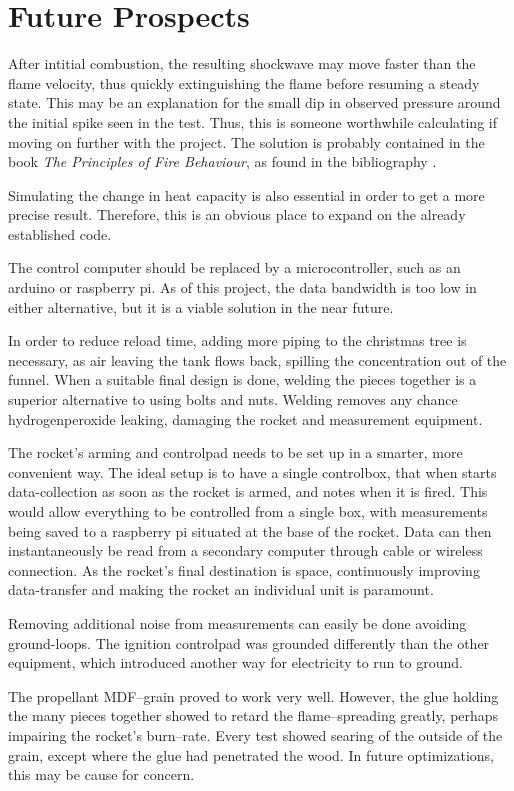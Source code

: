\chapter{Future Prospects}\label{cha:perspective}

After intitial combustion, the resulting shockwave may move faster than the flame velocity, thus quickly extinguishing the flame before resuming a steady state. This may be an explanation for the small dip in observed pressure around the initial spike seen in the test. Thus, this is someone worthwhile calculating if moving on further with the project. The solution is probably contained in the book \emph{The Principles of Fire Behaviour}, as found in the bibliography \cite{principlesoffire}.

Simulating the change in heat capacity is also essential in order to get a more precise result. Therefore, this is an obvious place to expand on the already established code.

The control computer should be replaced by a microcontroller, such as an arduino or raspberry pi. As of this project, the data bandwidth is too low in either alternative, but it is a viable solution in the near future.

In order to reduce reload time, adding more piping to the christmas tree is necessary, as air leaving the  tank flows back, spilling the  concentration out of the funnel. When a suitable final design is done, welding the pieces together is a superior alternative to using bolts and nuts. Welding removes any chance hydrogenperoxide leaking, damaging the rocket and measurement equipment.

The rocket's arming and controlpad needs to be set up in a smarter, more convenient way. The ideal setup is to have a single controlbox, that when starts data-collection as soon as the rocket is armed, and notes when it is fired. This would allow everything to be controlled from a single box, with measurements being saved to a raspberry pi situated at the base of the rocket. Data can then instantaneously be read from a secondary computer through cable or wireless connection. As the rocket's final destination is space, continuously improving data-transfer and making the rocket an individual unit is paramount.

Removing additional noise from measurements can easily be done avoiding ground-loops. The ignition controlpad was grounded differently than the other equipment, which introduced another way for electricity to run to ground.

The propellant MDF--grain proved to work very well. However, the glue holding the many pieces together showed to retard the flame--spreading greatly, perhaps impairing the rocket's burn--rate. Every test showed searing of the outside of the grain, except where the glue had penetrated the wood. In future optimizations, this may be cause for concern.
